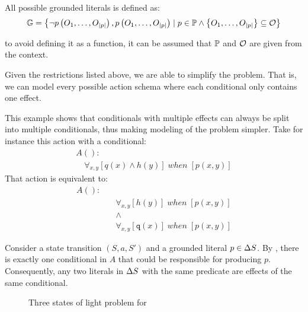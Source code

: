 \documentclass[\master/Master.tex]{subfiles}
\begin{document}
\begin{definition}
	All possible grounded literals \glits is defined as:
	\begin{equation*}
		\mathbb{G} =
		\left\{ \neg p\left(O_1, \dots, O_{|p|}\right), 
				p\left(O_1, \dots, O_{|p|}\right) 
				\mid 
		p \in \mathbb{P} \land 
		\left\{O_1, \dots, O_{|p|} \right\} \subseteq \mathcal{O}
		\right\}
	\end{equation*}
	
	to avoid defining it as a function, it can be assumed that $\mathbb{P}$ and $\mathcal{O}$ are given from the context.
\end{definition}


Given the restrictions listed above, we are able to simplify the problem. That is, we can model every possible action schema where each conditional only contains one effect.

\begin{example} This example shows that conditionals with multiple effects can always be split into multiple conditionals, thus making modeling of the problem simpler.
	Take for instance this action with a conditional:	
	\begin{align*}
		&A():&  \\
		&\quad
		\forall_{x, y}
			\left[
				q(x) \land h(y)
			\right]
		\; when \;
		\left[ p(x,y) \right]
	\end{align*}		
	That action is equivalent to: 
	\begin{align*}
		A():&  \\
			 &\quad\forall_{x, y}
				\left[
				h(y)
				\right]
				\; when \;
				\left[ p(x,y) \right] \\
		&\quad\land 	\\		
		&\quad\forall_{x, y}
		\left[
		\texttt{q}(x)
		\right]
		\; when \;
		\left[ p(x,y) \right]
	\end{align*}
	
\end{example}

\begin{proposition}\label{prop:ca:singleConditional}
    Consider a state transition $\left(S, a, S'\right)$ and a grounded literal $p \in \Delta S$. By , there is exactly one conditional in $A$ that could be responsible for producing $p$. Consequently, any two literals in $\Delta S$ with the same predicate are effects of the same conditional.
\end{proposition}

\begin{figure}
	\caption{\label{fig:ca:house-example}Three states of light problem for }
\end{figure}
\end{document}
